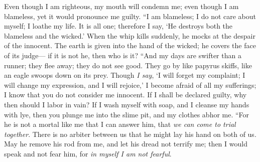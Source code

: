 \begin{biblechapter}
\verse Even though I am righteous, my mouth will condemn me; 
even though I am blameless, yet it would pronounce me guilty.
\verse “I am blameless; I do not care about myself; 
I loathe my life.
\verse It is all one; therefore I say, 
‘He destroys both the blameless and the wicked.’
\verse When the whip kills suddenly, 
he mocks at the despair of the innocent.
\verse The earth is given into the hand of the wicked; 
he covers the face of its judge— 
if it is not he, then who is it?
\verse “And my days are swifter than a runner; 
they flee away; they do not see good.
\verse They go by like papyrus skiffs, 
like an eagle swoops down on its prey.
\verse Though \textit{I say}, ‘I will forget my complaint; 
I will change my expression, and I will rejoice,’
\verse I become afraid of all my sufferings; 
I know that you do not consider me innocent.
\verse If I shall be declared guilty, 
why then should I labor in vain?
\verse If I wash myself with soap, 
and I cleanse my hands with lye,
\verse then you plunge me into the slime pit, 
and my clothes abhor me.
\verse “For he is not a mortal like me that I can answer him, 
that \textit{we can come to trial together}.
\verse There is no arbiter between us 
that he might lay his hand on both of us.
\verse May he remove his rod from me, 
and let his dread not terrify me;
\verse then I would speak and not fear him, 
for \textit{in myself I am not fearful}.
\end{biblechapter}

